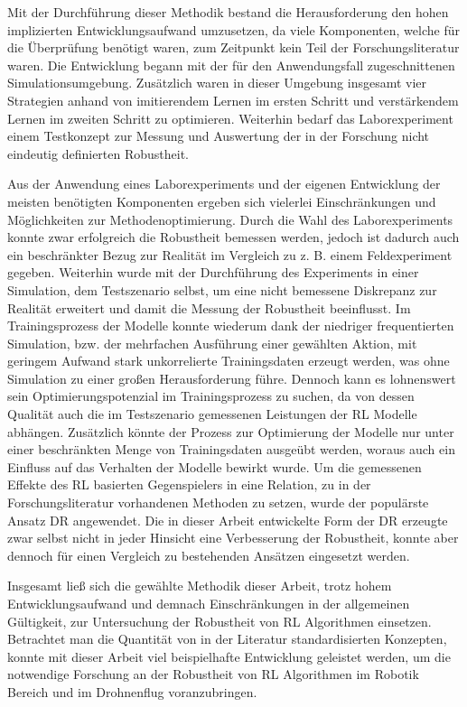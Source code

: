 Mit der Durchführung dieser Methodik bestand die Herausforderung den hohen implizierten Entwicklungsaufwand umzusetzen, da viele Komponenten, welche für die Überprüfung benötigt waren, zum Zeitpunkt kein Teil der Forschungsliteratur waren.
Die Entwicklung begann mit der für den Anwendungsfall zugeschnittenen Simulationsumgebung.
Zusätzlich waren in dieser Umgebung insgesamt vier Strategien anhand von imitierendem Lernen im ersten Schritt und verstärkendem Lernen im zweiten Schritt zu optimieren. 
Weiterhin bedarf das Laborexperiment einem Testkonzept zur Messung und Auswertung der in der Forschung nicht eindeutig definierten Robustheit.

Aus der Anwendung eines Laborexperiments und der eigenen Entwicklung der meisten benötigten Komponenten ergeben sich vielerlei Einschränkungen und Möglichkeiten zur Methodenoptimierung. %
Durch die Wahl des Laborexperiments konnte zwar erfolgreich die Robustheit bemessen werden, jedoch ist dadurch auch ein beschränkter Bezug zur Realität im Vergleich zu z. B. einem Feldexperiment gegeben.
Weiterhin wurde mit der Durchführung des Experiments in einer Simulation, dem Testszenario selbst, um eine nicht bemessene Diskrepanz zur Realität erweitert und damit die Messung der Robustheit beeinflusst.
Im Trainingsprozess der Modelle konnte wiederum dank der niedriger frequentierten Simulation, bzw. der mehrfachen Ausführung einer gewählten Aktion, mit geringem Aufwand stark unkorrelierte Trainingsdaten erzeugt werden, was ohne Simulation zu einer großen Herausforderung führe.
Dennoch kann es lohnenswert sein Optimierungspotenzial im Trainingsprozess zu suchen, da von dessen Qualität auch die im Testszenario gemessenen Leistungen der RL Modelle abhängen.
Zusätzlich könnte der Prozess zur Optimierung der Modelle nur unter einer beschränkten Menge von Trainingsdaten ausgeübt werden, woraus auch ein Einfluss auf das Verhalten der Modelle bewirkt wurde.
Um die gemessenen Effekte des RL basierten Gegenspielers in eine Relation, zu in der Forschungsliteratur vorhandenen Methoden zu setzen, wurde der populärste Ansatz DR angewendet.
Die in dieser Arbeit entwickelte Form der DR erzeugte zwar selbst nicht in jeder Hinsicht eine Verbesserung der Robustheit, konnte aber dennoch für einen Vergleich zu bestehenden Ansätzen eingesetzt werden.

Insgesamt ließ sich die gewählte Methodik dieser Arbeit, trotz hohem Entwicklungsaufwand und demnach Einschränkungen in der allgemeinen Gültigkeit, zur Untersuchung der Robustheit von RL Algorithmen einsetzen.
Betrachtet man die Quantität von in der Literatur standardisierten Konzepten, konnte mit dieser Arbeit viel beispielhafte Entwicklung geleistet werden, um die notwendige Forschung an der Robustheit von RL Algorithmen im Robotik Bereich und im Drohnenflug voranzubringen.

